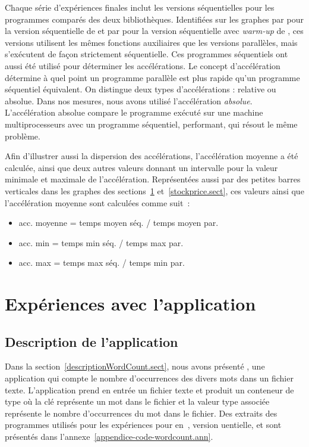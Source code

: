 Chaque s\'erie d'exp\'eriences finales inclut les versions s\'equentielles pour les programmes compar\'es des deux biblioth\`eques. Identifi\'ees sur les graphes par  pour la version s\'equentielle de  et par  pour la version s\'equentielle avec \emph{warm-up} de , ces versions utilisent les m\^emes fonctions auxiliaires que les versions parall\`eles, mais s'ex\'ecutent de fa\c{c}on strictement s\'equentielle. Ces programmes s\'equentiels ont aussi \'et\'e utilis\'e pour d\'eterminer les acc\'el\'erations. Le concept d'acc\'el\'eration d\'etermine \`a quel point un programme parall\`ele est plus rapide qu'un programme s\'equentiel \'equivalent. On distingue deux types d'acc\'elérations : relative ou absolue. Dans nos mesures, nous avons utilis\'e l'acc\'el\'eration \emph{absolue}. L'acc\'el\'eration absolue compare le programme ex\'ecut\'e sur une machine multiprocesseurs avec un programme s\'equentiel, performant, qui r\'esout le m\^eme probl\`eme. 

Afin d'illustrer aussi la dispersion des acc\'el\'erations, l'accélération moyenne a été calculée, ainsi que deux autres valeurs donnant un intervalle pour la valeur minimale et maximale de l'acc\'el\'eration. Repr\'esent\'ees aussi par des petites barres verticales dans les graphes des sections~\ref{wordcount.sect} et~\ref{stockprice.sect}, ces valeurs ainsi que l'accélération moyenne sont calcul\'ees comme suit~: 

\begin{itemize}
\item acc. moyenne  =  temps moyen séq. / temps moyen par.
\item acc. min  =  temps min séq. / temps max par.
\item acc. max = temps max séq. / temps min par.
\end{itemize}

\section{Expériences avec l'application }
\label{wordcount.sect}



\subsection{Description de l'application }

Dans la section~\ref{descriptionWordCount.sect}, nous avons pr\'esent\'e , une application qui compte le nombre d'occurrences des divers mots dans un fichier texte. L'application prend en entr\'ee un fichier texte et produit un conteneur de type  où la cl\'e repr\'esente un mot dans le fichier et la valeur  type   associ\'ee repr\'esente le nombre d'occurrences du mot dans le fichier. Des extraits des programmes utilis\'es pour les exp\'eriences pour  en~,  version uentielle,  et  sont pr\'esent\'es dans l'annexe~\ref{appendice-code-wordcount.ann}.

